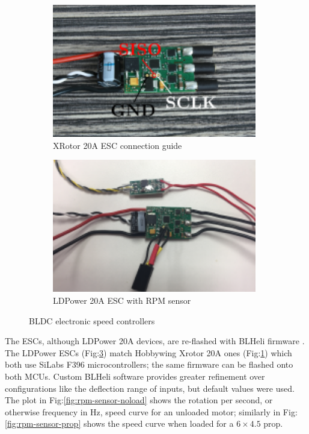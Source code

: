 \begin{figure}[hbtp]
\begin{subfigure}{0.5\textwidth}
\centering
\includegraphics[width=0.98\textwidth]{figs/xrotor-20A}
\caption{XRotor 20A ESC connection guide\cite{xrotor}}
\label{fig:xrotor-20A}
\end{subfigure}
\begin{subfigure}{0.5\textwidth}
\centering
\includegraphics[width=0.98\textwidth]{figs/ldpower-20A}
\caption{LDPower 20A ESC with RPM sensor}
\label{fig:ldpower-20A}
\end{subfigure}
\caption{BLDC electronic speed controllers}
\vspace{-6pt}
\end{figure}
\par
The ESCs, although LDPower 20A devices, are re-flashed with BLHeli firmware \cite{BLHeli}. The LDPower ESCs (Fig:\ref{fig:ldpower-20A}) match Hobbywing Xrotor 20A ones (Fig:\ref{fig:xrotor-20A}) which both use SiLabs F396 microcontrollers; the same firmware can be flashed onto both MCUs. Custom BLHeli software provides greater refinement over configurations like the deflection range of inputs, but default values were used. The plot in Fig:\ref{fig:rpm-sensor-noload} shows the rotation per second, or otherwise frequency in Hz, speed curve for an unloaded motor; similarly in Fig:\ref{fig:rpm-sensor-prop} shows the speed curve when loaded for a $6\times 4.5$ prop. 
